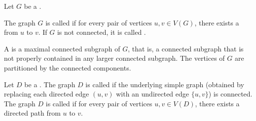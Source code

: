 \begin{definition} \label{definition:connected_graph_connectivity_of_a_graph}
Let $G$ be a .

The graph $G$ is called  if for every pair of vertices $u, v \in V(G)$, there exists a  from $u$ to $v$. If $G$ is not connected, it is called .

A  is a maximal connected subgraph of $G$, that is, a connected subgraph that is not properly contained in any larger connected subgraph. The vertices of $G$ are partitioned by the connected components.

Let $D$ be a . The graph $D$ is called  if the underlying simple graph (obtained by replacing each directed edge $(u,v)$ with an undirected edge $\{u,v\}$) is connected. The graph $D$ is called  if for every pair of vertices $u, v \in V(D)$, there exists a directed path from $u$ to $v$.
\end{definition}
